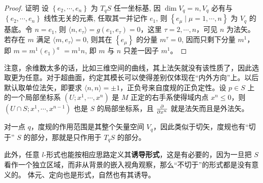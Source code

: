 \begin{proof}
    证明 设 $\left\{e_2, \cdots,e_n\right\}$ 为 $T_q S$ 任一坐标基, 因 $\dim V_q=n, V_q$ 必有与 $\left\{e_2,\cdots,e_n\right\}$ 线性无关的元素, 任取其一并记作 $e_1$, 则 $\left\{e_\mu\mid\mu=1, \cdots, n\right\}$ 为 $V_q$ 的基底。令 $n=e_1$, 则 $\langle n, e_\tau\rangle =g(e_1,e_\tau)=0$，这里 $\tau=2,\cdots,n$，可见 $n$ 为法矢。若存在 $m$ 满足 $\langle m,e_\tau\rangle=0$, 则其在 $\left\{e_\mu\right\}$ 的分量 $m^\tau=0$, 因而只剩下分量 $m^1$，即 $m=m^1\left(e_1\right)^a$ $=m^1n$, 即 $m$ 与 $n$ 只差一因子 $m^1$。
\end{proof}

注意，余维数太多的话，比如三维空间的曲线，其上法矢就没有该性质了，因此选取更为任意。对于超曲面，约定其模长可以使得差别仅体现在“内外方向”上。以后默认取单位法矢，即要求 $\langle n,n\rangle=\pm 1$，正负号来自度规的正负定性。设 $p\in S$ 上的一个局部坐标系 $(U;x^1,\cdots,x^{n})$ 是 $M$ 正定的右手系使得域内点 $x^n\leqslant 0$，则$(U\cap S;x^1,\cdots,x^{n-1})$ 也是 $S$ 的局部坐标系，且 $\pdv{x^n}$ 就是法矢而且是外法矢。

对一点 $q$，度规的作用范围是其整个矢量空间 $V_q$，因此类似于切矢，度规也有“切于” $S$ 的部分，那就是只作用于 $T_qS$ 的部分。


此外，任意 $l$-形式也能按相应思路定义其\textbf{诱导形式}，这是有必要的，因为一旦把 $S$ 看作一个独立区域，而非从背景的嵌入视角观察，那么“不切于”的形式都是没有意义的。
体元、定向也是形式，自然也有其诱导。


